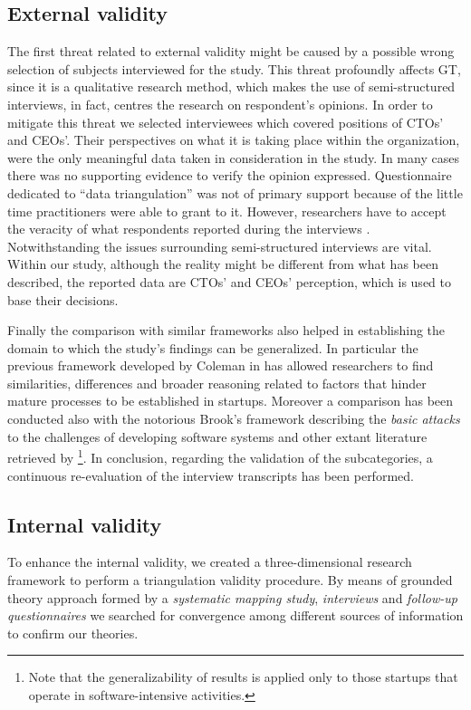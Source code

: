 \documentclass[10pt,journal,letterpaper,compsoc]{IEEEtran}
\begin{document}
\subsection{External validity}
The first threat related to external validity might be caused by a possible 
wrong selection of subjects interviewed for the study. This threat profoundly 
affects GT, since it is a qualitative research method, which makes the use of 
semi-structured interviews, in fact, centres the research on respondent's 
opinions. In order to mitigate this threat we selected interviewees which 
covered positions of CTOs' and CEOs'. Their perspectives on what it is taking 
place within the organization, were the only meaningful data taken in 
consideration in the study.  In many cases there was no supporting evidence to 
verify the opinion expressed. Questionnaire dedicated to ``data triangulation'' 
was not of primary support because of the little time practitioners were able to 
grant to it. However, researchers have to accept the veracity of what 
respondents reported during the interviews \cite{Coleman2008a}. Notwithstanding 
the issues surrounding semi-structured interviews are vital. Within our study, 
although the reality might be different from what has been described, the 
reported data are CTOs' and CEOs' perception, which is used to base their 
decisions.

Finally the comparison with similar frameworks also helped in establishing the 
domain to which the study's findings can be generalized. In particular the 
previous framework developed by Coleman in \cite{Coleman2008} has allowed 
researchers to find similarities, differences and broader reasoning related to 
factors that hinder mature processes to be established in startups. Moreover a 
comparison has been conducted also with the notorious Brook's framework 
describing the \textit{basic attacks} to the challenges of developing software 
systems and other extant literature retrieved by \cite{SMS}\footnote{Note that 
the generalizability of results is applied only to those startups that operate 
in software-intensive activities.}. In conclusion, regarding the validation of 
the subcategories, a continuous re-evaluation of the interview transcripts has 
been performed.

\subsection{Internal validity}
To enhance the internal validity, we created a three-dimensional research 
framework to perform a triangulation validity procedure. By means of grounded 
theory approach formed by a \textit{systematic mapping study}, 
\textit{interviews} and  \textit{follow-up questionnaires} we searched for 
convergence among different sources of information to confirm our theories.
\end{document}
